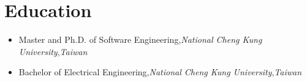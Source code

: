 \documentclass[a4paper,11pt]{article}
\newcommand{\resumeEducationItem}[3]{
  \vspace{-1pt}\item
    {#1}{,}\hspace{4pt}\textit{#2}{,}\hspace{4pt}\textit{#3}\vspace{-6pt}
}
\newcommand{\resumeSubHeadingListStart}{\begin{itemize}[leftmargin=*]}
\newcommand{\resumeSubHeadingListEnd}{\end{itemize}}
\begin{document}
\section{Education}
  \resumeSubHeadingListStart
    \resumeEducationItem
      {Master and Ph.D. of Software Engineering}{National Cheng Kung University}{Taiwan}
    \resumeEducationItem
      {Bachelor of Electrical Engineering}{National Cheng Kung University}{Taiwan}
  \resumeSubHeadingListEnd

%


\end{document}
